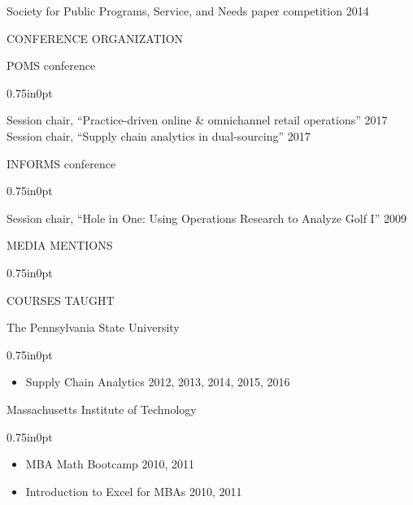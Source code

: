 \documentclass[letterpaper,11pt,oneside]{article}
\newcommand\myIndent{0.75in}
\newcommand\myParSkip{3pt}
\newcommand\myHangIndent{1in}
\newcommand\mySpaceBeforeSection{0.9em}
\newcommand\myNegSpaceCorrectBib{-4.25em}
\newcommand\mySpaceBeforeSectionAfterBib{0em}
\newcommand{\NiceIndent}{ \parindent=\myIndent \hangindent=\myHangIndent }
\newenvironment{miniListBullet}
    {
        \begin{adjustwidth}{\myIndent}{0pt}
        \setlength{\parskip}{0pt}%
        \renewcommand\labelitemi{{\boldmath$\cdot$}}
        \begin{itemize}
        \setlength\itemsep{0em}
    }
    {
        \end{itemize}
        \setlength{\parskip}{\myParSkip}%
        \end{adjustwidth}
    }
\begin{document}
\NiceIndent Society for Public Programs, Service, and Needs paper competition 2014



\vspace{\mySpaceBeforeSection}
\noindent CONFERENCE ORGANIZATION

\NiceIndent POMS conference
\begin{miniListBullet}
    Session chair, ``Practice-driven online \& omnichannel retail operations'' 2017 \\
    Session chair, ``Supply chain analytics in dual-sourcing'' 2017
\end{miniListBullet}

\NiceIndent INFORMS conference
\begin{miniListBullet}
    Session chair, ``Hole in One: Using Operations Research to Analyze Golf I'' 2009
\end{miniListBullet}


\vspace{\mySpaceBeforeSection}

\noindent MEDIA MENTIONS

\vspace{\myNegSpaceCorrectBib}
\begin{bibunit}
    \begin{adjustwidth}{\myIndent}{0pt}
        
        \nocite{barrett_crunch_2014}
        \nocite{agger_dark_2010}
        \nocite{newport_stat_2010}
        
        \putbib
    \end{adjustwidth}
\end{bibunit}

\vspace{\mySpaceBeforeSectionAfterBib}
\noindent COURSES TAUGHT

\NiceIndent The Pennsylvania State University
\begin{miniListBullet}
    \item Supply Chain Analytics 2012, 2013, 2014, 2015, 2016
\end{miniListBullet}

\NiceIndent Massachusetts Institute of Technology
\begin{miniListBullet}
    \item MBA Math Bootcamp 2010, 2011
    \item Introduction to Excel for MBAs 2010, 2011
\end{miniListBullet}
\end{document}
